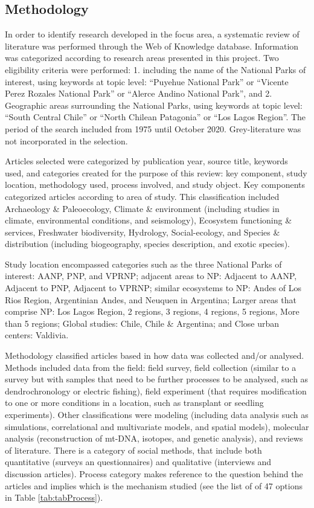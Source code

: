 \documentclass[]{article}
\begin{document}
\hypertarget{methodology}{%
\subsection{Methodology}\label{methodology}}

In order to identify research developed in the focus area, a systematic review of literature was performed through the Web of Knowledge database. Information was categorized according to research areas presented in this project.
Two eligibility criteria were performed: 1. including the name of the National Parks of interest, using keywords at topic level: ``Puyehue National Park'' or ``Vicente Perez Rozales National Park'' or ``Alerce Andino National Park'', and 2. Geographic areas surrounding the National Parks, using keywords at topic level: ``South Central Chile'' or ``North Chilean Patagonia'' or ``Los Lagos Region''. The period of the search included from 1975 until October 2020. Grey-literature was not incorporated in the selection.

Articles selected were categorized by publication year, source title, keywords used, and categories created for the purpose of this review: key component, study location, methodology used, process involved, and study object.
Key components categorized articles according to area of study. This classification included Archaeology \& Paleoecology, Climate \& environment (including studies in climate, environmental conditions, and seismology), Ecosystem functioning \& services, Freshwater biodiversity, Hydrology, Social-ecology, and Species \& distribution (including biogeography, species description, and exotic species).

Study location encompassed categories such as the three National Parks of interest: AANP, PNP, and VPRNP; adjacent areas to NP: Adjacent to AANP, Adjacent to PNP, Adjacent to VPRNP; similar ecosystems to NP: Andes of Los Rios Region, Argentinian Andes, and Neuquen in Argentina; Larger areas that comprise NP: Los Lagos Region, 2 regions, 3 regions, 4 regions, 5 regions, More than 5 regions; Global studies: Chile, Chile \& Argentina; and Close urban centers: Valdivia.

Methodology classified articles based in how data was collected and/or analysed.
Methods included data from the field: field survey, field collection (similar to a survey but with samples that need to be further processes to be analysed, such as dendrochronology or electric fishing), field experiment (that requires modification to one or more conditions in a location, such as transplant or seedling experiments).
Other classifications were modeling (including data analysis such as simulations, correlational and multivariate models, and spatial models), molecular analysis (reconstruction of mt-DNA, isotopes, and genetic analysis), and reviews of literature.
There is a category of social methods, that include both quantitative (surveys an questionnaires) and qualitative (interviews and discussion articles).
Process category makes reference to the question behind the articles and implies which is the mechanism studied (see the list of of 47 options in Table \ref{tab:tabProcess}).
\end{document}
